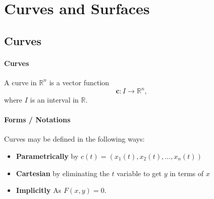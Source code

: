 \section{Curves and Surfaces}
\subsection{Curves}
\paragraph{Curves}
A curve in \(\mathbb{R}^n\) is a vector function
\[\mathbf{c}: I \to\mathbb{R}^n,\]
where \(I\) is an interval in \(\mathbb{R}\).

\paragraph{Forms / Notations}
Curves may be defined in the following ways:
\begin{itemize}
    \item \textbf{Parametrically} by \(c(t) = \left(x_1(t), x_2(t), \dots, x_n(t)\right)\)
    \item \textbf{Cartesian} by eliminating the \(t\) variable to get \(y\) in terms of \(x\)
    \item \textbf{Implicitly} As \(F(x, y) = 0\).
\end{itemize}
